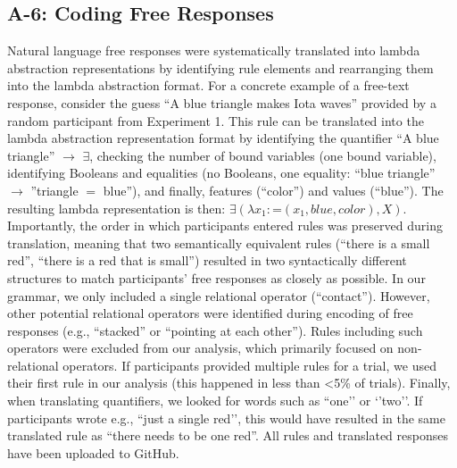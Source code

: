 \documentclass[doc,natbib,floatsintext]{apa7}
\begin{document}
\begin{appendices}
\subsection{A-6: Coding Free Responses}\label{ap:a6_free_response_coding}
Natural language free responses were systematically translated into lambda abstraction representations by identifying rule elements and rearranging them into the lambda abstraction format. For a concrete example of a free-text response, consider the guess ``A blue triangle makes Iota waves'' provided by a random participant from Experiment 1. This rule can be translated into the lambda abstraction representation format by identifying the quantifier ``A blue triangle'' \(\rightarrow\) \(\exists\), checking the number of bound variables (one bound variable), identifying  Booleans and equalities (no Booleans, one equality: ``blue triangle'' \(\rightarrow\) ''triangle \(=\) blue''), and finally, features (``color'') and values (``blue''). The resulting lambda representation is then: \(\exists(\lambda x_{1}: \text{=}(x_{1},blue,color), X)\). Importantly, the order in which participants entered rules was preserved during translation, meaning that two semantically equivalent rules (``there is a small red'', ``there is a red that is small'') resulted in two syntactically different structures to match participants' free responses as closely as possible. In our grammar, we only included a single relational operator (``contact''). However, other potential relational operators were identified during encoding of free responses (e.g., ``stacked'' or ``pointing at each other''). Rules including such operators were excluded from our analysis, which primarily focused on non-relational operators. If participants provided multiple rules for a trial, we used their first rule in our analysis (this happened in less than <5\% of trials). Finally, when translating quantifiers, we looked for words such as ``one’’ or ‘’two’’. If participants wrote e.g., ``just a single red’’, this would have resulted in the same translated rule as ``there needs to be one red''. All rules and translated responses have been uploaded to GitHub.



\end{appendices}
\end{document}
